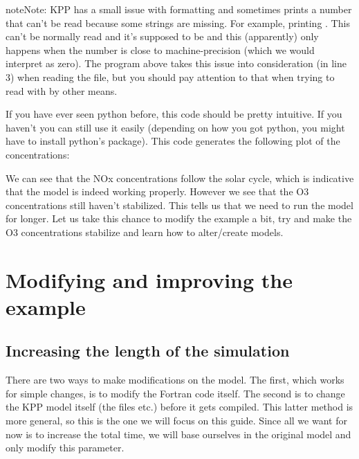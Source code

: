 \documentclass[letterpaper,10pt,openany,oneside]{sphinxmanual}
\begin{document}
\begin{notice}{note}{Note:}
KPP has a small issue with formatting and sometimes prints a number that can't
be read because some strings are missing. For example, printing .
This can't be normally read and it's supposed to be  and this
(apparently) only happens when the number is close to machine-precision (which
we would interpret as zero). The program above takes this issue into
consideration (in line 3) when reading the file, but you should pay attention to that when
trying to read with by other means.
\end{notice}

If you have ever seen python before, this code should be pretty intuitive. If
you haven't you can still use it easily (depending on how you got python, you
might have to install python's  package).  This code generates the
following plot of the concentrations:
\label{running:test1-time}\begin{figure}[htbp]
\centering

\noindent{}
\label{running:test1-time}\end{figure}

We can see that the NOx concentrations follow the solar cycle, which is
indicative that the model is indeed working properly. However we see that the
O3 concentrations still haven't stabilized. This tells us that we need to run
the model for longer. Let us take this chance to modify the 
example a bit, try and make the O3 concentrations stabilize and learn how to
alter/create models.


\chapter{Modifying and improving the example}
\label{improving:modifying-and-improving-the-example}\label{improving::doc}

\section{Increasing the length of the simulation}
\label{improving:increasing-the-length-of-the-simulation}
There are two ways to make modifications on the model. The first, which works
for simple changes, is to modify the Fortran code itself. The second is to
change the KPP model itself (the  files etc.) before it gets compiled.
This latter method is more general, so this is the one we will focus on this
guide.  Since all we want for now is to increase the total time, we will base
ourselves in the original  model and only modify this
parameter.
\end{document}
